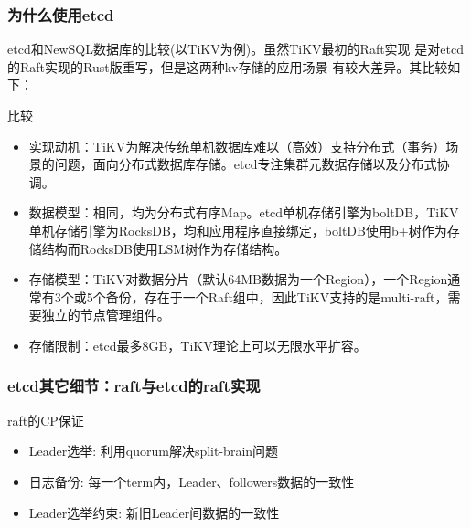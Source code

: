 \documentclass{beamer}
\begin{document}
%
%
\begin{frame}
\frametitle{为什么使用etcd}

etcd和NewSQL数据库的比较(以TiKV为例)。虽然TiKV最初的Raft实现
是对etcd的Raft实现的Rust版重写，但是这两种kv存储的应用场景
有较大差异。其比较如下：

\begin{alertblock}{比较}
    \begin{itemize}
        \item 实现动机：TiKV为解决传统单机数据库难以（高效）支持分布式（事务）场景的问题，面向分布式数据库存储。etcd专注集群元数据存储以及分布式协调。
        \item 数据模型：相同，均为分布式有序Map。etcd单机存储引擎为boltDB，TiKV单机存储引擎为RocksDB，均和应用程序直接绑定，boltDB使用b+树作为存储结构而RocksDB使用LSM树作为存储结构。
        \item 存储模型：TiKV对数据分片（默认64MB数据为一个Region），一个Region通常有3个或5个备份，存在于一个Raft组中，因此TiKV支持的是multi-raft，需要独立的节点管理组件。
        \item 存储限制：etcd最多8GB，TiKV理论上可以无限水平扩容。
    \end{itemize}
\end{alertblock}

\end{frame}

%
%
\begin{frame}
    \frametitle{etcd其它细节：raft与etcd的raft实现}
    
    \begin{block}{raft的CP保证}
    \begin{itemize}
        \item Leader选举: 利用quorum解决split-brain问题
        \item 日志备份: 每一个term内，Leader、followers数据的一致性
        \item Leader选举约束: 新旧Leader间数据的一致性
    \end{itemize}
    \end{block}
        
    
    \end{frame}
\end{document}
